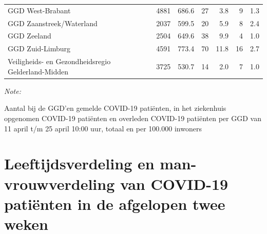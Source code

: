 \documentclass[
  english,
  man,floatsintext]{apa6}
\begin{document}
\begin{table}
\begin{threeparttable}
\begin{tabular}{lrrrrrr}
GGD West-Brabant & 4881 & 686.6 & 27 & 3.8 & 9 & 1.3\\
GGD Zaanstreek/Waterland & 2037 & 599.5 & 20 & 5.9 & 8 & 2.4\\
GGD Zeeland & 2504 & 649.6 & 38 & 9.9 & 4 & 1.0\\
GGD Zuid-Limburg & 4591 & 773.4 & 70 & 11.8 & 16 & 2.7\\
Veiligheids- en Gezondheidsregio Gelderland-Midden & 3725 & 530.7 & 14 & 2.0 & 7 & 1.0\\
\bottomrule
\end{tabular}
\begin{tablenotes}
\item \textit{Note: } 
\item Aantal bij de GGD’en gemelde COVID-19 patiënten, in het ziekenhuis opgenomen COVID-19 patiënten en overleden COVID-19 patiënten per GGD van 11 april t/m 25 april 10:00 uur, totaal en per 100.000 inwoners
\end{tablenotes}
\end{threeparttable}
\endgroup{}
\end{table}

\newpage

\hypertarget{leeftijdsverdeling-en-man-vrouwverdeling-van-covid-19-patiuxebnten-in-de-afgelopen-twee-weken}{%
\section{Leeftijdsverdeling en man-vrouwverdeling van COVID-19 patiënten in de afgelopen twee weken}\label{leeftijdsverdeling-en-man-vrouwverdeling-van-covid-19-patiuxebnten-in-de-afgelopen-twee-weken}}
\end{document}
